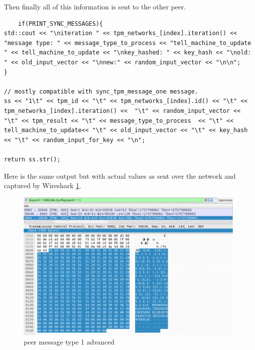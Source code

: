 Then finally all of this information is sent to the other peer.
\begin{lstlisting}
    if(PRINT_SYNC_MESSAGES){
std::cout << "\niteration " << tpm_networks_[index].iteration() << "message type: " << message_type_to_process << "tell_machine_to_update " << tell_machine_to_update << "\nkey_hashed: " << key_hash << "\nold: " << old_input_vector << "\nnew:" << random_input_vector << "\n\n";  
}

// mostly compatible with sync_tpm_message_one message.
ss << "1\t" << tpm_id << "\t" << tpm_networks_[index].id() << "\t" << tpm_networks_[index].iteration() <<  "\t" << random_input_vector << "\t" << tpm_result << "\t" << message_type_to_process  << "\t" << tell_machine_to_update<< "\t" << old_input_vector << "\t" << key_hash << "\t" << random_input_for_key << "\n";

return ss.str();
\end{lstlisting}
Here is the same output but with actual values as sent over the network and captured by Wireshark \ref{fig:sync6}.
\begin{figure}[!h]
	\centering
	\includegraphics[width=1\textwidth]{Figures/sync6.png}
	\caption[peer message type 1 advanced]{peer message type 1 advanced}
	\label{fig:sync6}
\end{figure}
\FloatBarrier

